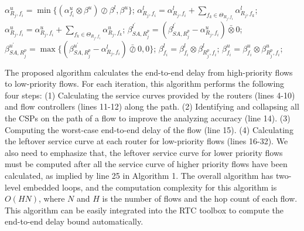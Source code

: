 \documentclass[10pt,journal]{IEEEtran}
\begin{document}
\begin{algorithm}
\begin{algorithmic}[1]
                \STATE $\alpha^u_{R_j,f_i}=\min\{(\alpha^u_{f_i}\otimes\beta^u)\oslash\beta^l,\beta^u\}$;
                    \STATE $\alpha^l_{R_j,f_i}=\alpha^l_{R_j,f_i}+\sum_{f_k\in\Theta_{R_j,f_i}}\alpha^l_{R_j,f_k}$;
                    \STATE $\alpha^u_{R_j,f_i}=\alpha^u_{R_j,f_i}+\sum_{f_k\in\Theta_{R_j,f_i}}\alpha^u_{R_j,f_k}$;
                    \STATE $\beta^{l^\prime}_{SA,R_j^{p}}=(\beta^{l^\prime}_{SA,R_j^{p}}-\alpha^u_{R_j,f_i})\bar{\otimes}0$;
                    \STATE $\beta^{u^\prime}_{SA,R_j^{p}}=\max\{(\beta^{u^\prime}_{SA,R_j^{p}}-\alpha^l_{R_j,f_i})\bar{\oslash}0,0\}$;
                \ENDIF
            \ENDIF
            \STATE $\beta_{f_i}^l=\beta_{f_i}^l\otimes\beta^l_{R_j^{p},f_i}$; $\beta_{f_i}^u=\beta_{f_i}^u\otimes\beta^u_{R_j^{p},f_i}$;
        \ENDFOR
    \ENDFOR
\end{algorithmic}
\end{algorithm}

The proposed algorithm calculates the end-to-end delay from high-priority flows to low-priority flows. For each iteration, this algorithm performs the following four steps: (1) Calculating the service curves provided by the routers (lines 4-10) and flow controllers (lines 11-12) along the path. (2) Identifying and collapsing all the CSPs on the path of a flow to improve the analyzing accuracy (line 14). (3) Computing the worst-case end-to-end delay of the flow (line 15). (4) Calculating the leftover service curve at each router for low-priority flows (lines 16-32). We also need to emphasize that, the leftover service curve for lower priority flows must be computed after all the service curve of higher priority flows have been calculated, as implied by line 25 in Algorithm 1. The overall algorithm has two-level embedded loops, and the computation complexity for this algorithm is $O(HN)$, where $N$ and $H$ is the number of flows and the hop count of each flow. This algorithm can be easily integrated into the RTC toolbox \cite{rtc} to compute the end-to-end delay bound automatically.
\end{document}

